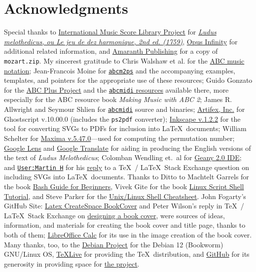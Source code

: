 \documentclass[a4paper,x11names,svgnames,10pt]{article}
\begin{document}
{\section{Acknowledgments}
Special thanks to \href{https://imslp.org}{International Music Score Library Project} for \href{https://imslp.org/wiki/Ludus_Melothedicus_(Anonymous)}{\it Ludus melothedicus, ou Le jeu de dez harmonique, 2nd ed. (1759)}, \href{https://opus-infinity.org}{Opus Infinity} for additional related information, and \href{http://www.amaranthpublishing.com/MozartDiceGame.htm}{Amaranth Publishing} for a copy of {\tt mozart.zip}. My sincerest gratitude to Chris Walshaw et al. for the \href{http://www.abcnotation.com/}{ABC music notation}; Jean-Francois Moine for \href{http://moinejf.free.fr/}{\tt abcm2ps} and the accompanying examples, templates, and pointers for the appropriate use of these resources; Guido Gonzato for the \href{http://abcplus.sourceforge.net/}{ABC Plus Project} and the \href{http://abcplus.sourceforge.net/#abcMIDI}{{\tt abcmidi} resources} available there, more especially for the ABC resource book {\em Making Music with ABC 2}; James R. Allwright and Seymour Shlien for \href{http://abc.sourceforge.net/abcMIDI}{\tt abcmidi} source and binaries; \href{https://artifex.com/}{Artifex, Inc.} for Ghostscript v.10.00.0 (includes the {\tt ps2pdf} converter); \href{https://www.inkscape.org/}{Inkscape v.1.2.2} for the tool for converting SVGs to PDFs for inclusion into \LaTeX\ documents; William Schelter for \href{https://maxima.sourceforge.io}{Maxima v.5.47.0}---used for computing the permutation number; \href{https://google.lens}{Google Lens} and \href{https://translate.google.com}{Google Translate} for aiding in producing the English versions of the text of {\it Ludus Melothedicus}; Colomban Wendling et.\ al for \href{https://www.geany.org}{Geany 2.0 IDE}; and \href{https://tex.stackexchange.com/users/632/martin-h}{\tt User:Martin H} for his \href{https://tex.stackexchange.com/questions/2099/how-to-include-svg-diagrams-in-latex}{reply} to a \TeX\ / \LaTeX\ Stack Exchange question on including SVGs into \LaTeX\ documents. Thanks to  Ditto to Machtelt Garrels for the book \href{http://tldp.org/LDP/Bash-Beginners-Guide/html/Bash-Beginners-Guide.html}{Bash Guide for Beginners}, Vivek Gite for the book \href{http://www.freeos.com/guides/lsst/}{Linux Script Shell Tutorial}, and Steve Parker for the \href{http://steve-parker.org/sh/cheatsheet.pdf}{Unix/Linux Shell Cheatsheet}. John Fogarty's GitHub Site: \href{https://github.com/jfogarty/latex-createspace-bookcover}{Latex CreateSpace BookCover} and Peter Wilson's reply in  \TeX\ / \LaTeX\ Stack Exchange on \href{https://tex.stackexchange.com/questions/17579/how-can-i-design-a-book-cover}{designing a book cover}, were sources of ideas, information, and materials for creating the book cover and title page, thanks to both of them; \href{http://www.libreoffice.org/}{LibreOffice Calc} for its use in the image creation of the book cover.  Many thanks, too, to the \href{https://www.debian.org}{Debian Project} for the Debian 12 (Bookworm) GNU/Linux OS, \href{http://www.tug.org/texlive/}{TeXLive} for providing the \TeX\ distribution,  and \href{https://github.com}{GitHub} for its generosity in providing space for \href{https://github.com/justineuro/mdgBookSVG7Kit}{the project}.  
}
\end{document}
